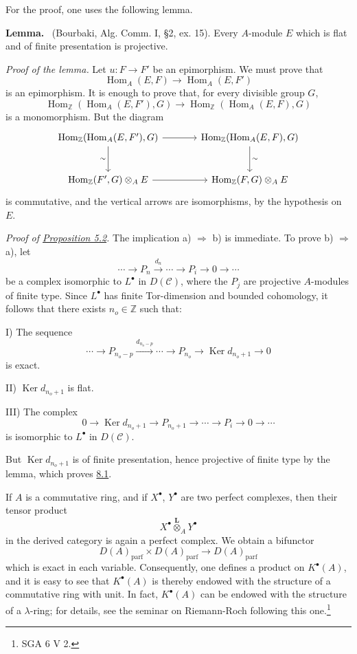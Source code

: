 \documentclass[11pt]{article}
\newenvironment{statement}[1]{\par\medskip\noindent\textbf{#1.}\ }{\par\medskip}
\DeclareMathOperator{\Hom}{Hom}
\providecommand{\Ker}{\operatorname{Ker}}
\providecommand{\parf}{\mathrm{parf}}
\providecommand{\Hom}{\operatorname{Hom}}
\providecommand{\cC}{\mathcal C}
\providecommand{\Ker}{\operatorname{Ker}}
\providecommand{\Ker}{\operatorname{Ker}}
\providecommand{\cC}{\mathcal C}
\providecommand{\parf}{\mathrm{parf}}
\providecommand{\Hom}{\operatorname{Hom}}
\begin{document}
For the proof, one uses the following lemma.

\begin{statement}{Lemma}
(Bourbaki, Alg. Comm. I, §2, ex. 15). Every $A$-module $E$ which is flat and of finite presentation is projective.
\end{statement}

\emph{Proof of the lemma.} Let $u:F\to F'$ be an epimorphism. We must prove that
\[
\Hom_A(E,F)\longrightarrow\Hom_A(E,F')
\]
is an epimorphism. It is enough to prove that, for every divisible group $G$,
\[
\Hom_{\mathbb Z}(\Hom_A(E,F'),G)\longrightarrow
\Hom_{\mathbb Z}(\Hom_A(E,F),G)
\]
is a monomorphism. But the diagram
\[
\begin{tikzcd}[column sep=large,row sep=large]
\Hom_{\mathbb Z}(\Hom_A(E,F'),G)
 \arrow[r]\arrow[d,"\sim"']&
\Hom_{\mathbb Z}(\Hom_A(E,F),G)\arrow[d,"\sim"]\\
\Hom_{\mathbb Z}(F',G)\otimes_A E
 \arrow[r]&
\Hom_{\mathbb Z}(F,G)\otimes_A E
\end{tikzcd}
\]
is commutative, and the vertical arrows are isomorphisms, by the hypothesis on $E$.

\emph{Proof of \hyperref[sga5:VIII:proposition:8.1]{Proposition 5.2}.} The implication a) $\Rightarrow$ b) is immediate. To prove b) $\Rightarrow$ a), let
\[
\cdots\longrightarrow P_n\xrightarrow{d_n}\cdots\longrightarrow P_i\longrightarrow 0\longrightarrow\cdots
\]
be a complex isomorphic to $L^\bullet$ in $D(\cC)$, where the $P_j$ are projective $A$-modules of finite type. Since $L^\bullet$ has finite Tor-dimension and bounded cohomology, it follows that there exists $n_o\in\mathbb Z$ such that:

I) The sequence
\[
\cdots\longrightarrow P_{n_o-p}\xrightarrow{d_{n_o-p}}\cdots\longrightarrow
P_{n_o}\longrightarrow \Ker d_{n_o+1}\longrightarrow0
\]
is exact.

II) $\Ker d_{n_o+1}$ is flat.

III) The complex
\[
0\longrightarrow \Ker d_{n_o+1}\longrightarrow P_{n_o+1}\longrightarrow\cdots\longrightarrow P_i\longrightarrow0\longrightarrow\cdots
\]
is isomorphic to $L^\bullet$ in $D(\cC)$.

But $\Ker d_{n_o+1}$ is of finite presentation, hence projective of finite type by the lemma, which proves \hyperref[sga5:VIII:proposition:8.1]{8.1}.

If $A$ is a commutative ring, and if $X^\bullet$, $Y^\bullet$ are two perfect complexes, then their tensor product
\[
X^\bullet\overset{\mathbf L}{\otimes}_A Y^\bullet
\]
in the derived category is again a perfect complex. We obtain a bifunctor
\[
D(A)_{\parf}\times D(A)_{\parf}\longrightarrow D(A)_{\parf}
\]
which is exact in each variable. Consequently, one defines a product on $K^\bullet(A)$, and it is easy to see that $K^\bullet(A)$ is thereby endowed with the structure of a commutative ring with unit. In fact, $K^\bullet(A)$ can be endowed with the structure of a $\lambda$-ring; for details, see the seminar on Riemann-Roch following this one.\footnote{SGA 6 V 2.}
\end{document}

